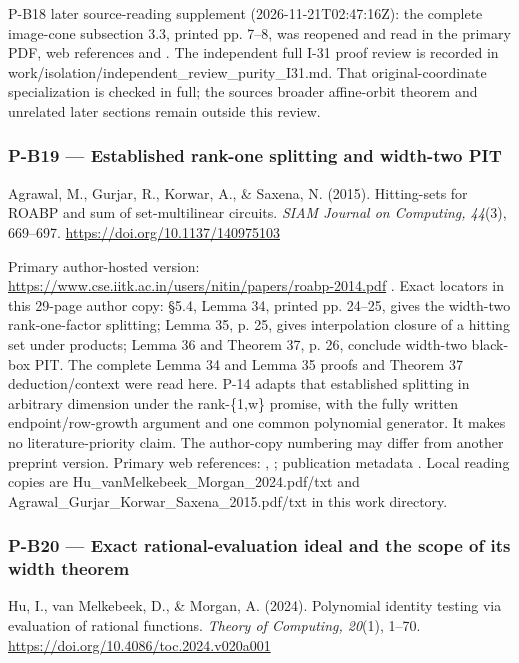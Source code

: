 \documentclass[11pt,a4paper]{article}
\theoremstyle{definition}\newtheorem{definition}{Definition}
\begin{document}
P-B18 later source-reading supplement (2026-11-21T02:47:16Z): the
complete image-cone subsection 3.3, printed pp. 7--8, was reopened and
read in the primary PDF, web references and . The independent full I-31
proof review is recorded in
work/isolation/independent\_review\_purity\_I31.md. That
original-coordinate specialization is checked in full; the
source\textquotesingle s broader affine-orbit theorem and unrelated
later sections remain outside this review.

\subsubsection{P-B19 --- Established rank-one splitting and width-two
PIT}\label{p-b19--established-rank-one-splitting-and-width-two-pit}

Agrawal, M., Gurjar, R., Korwar, A., \& Saxena, N. (2015). Hitting-sets
for ROABP and sum of set-multilinear circuits. \emph{SIAM Journal on
Computing, 44}(3), 669--697. \url{https://doi.org/10.1137/140975103}

Primary author-hosted version:
\url{https://www.cse.iitk.ac.in/users/nitin/papers/roabp-2014.pdf} .
Exact locators in this 29-page author copy: §5.4, Lemma 34, printed pp.
24--25, gives the width-two rank-one-factor splitting; Lemma 35, p. 25,
gives interpolation closure of a hitting set under products; Lemma 36
and Theorem 37, p. 26, conclude width-two black-box PIT. The complete
Lemma 34 and Lemma 35 proofs and Theorem 37 deduction/context were read
here. P-14 adapts that established splitting in arbitrary dimension
under the rank-\{1,w\} promise, with the fully written
endpoint/row-growth argument and one common polynomial generator. It
makes no literature-priority claim. The author-copy numbering may differ
from another preprint version. Primary web references: , ; publication
metadata . Local reading copies are
Hu\_vanMelkebeek\_Morgan\_2024.pdf/txt and
Agrawal\_Gurjar\_Korwar\_Saxena\_2015.pdf/txt in this work directory.

\subsubsection{P-B20 --- Exact rational-evaluation ideal and the scope
of its width
theorem}\label{p-b20--exact-rational-evaluation-ideal-and-the-scope-of-its-width-theorem}

Hu, I., van Melkebeek, D., \& Morgan, A. (2024). Polynomial identity
testing via evaluation of rational functions. \emph{Theory of Computing,
20}(1), 1--70. \url{https://doi.org/10.4086/toc.2024.v020a001}
\end{document}
